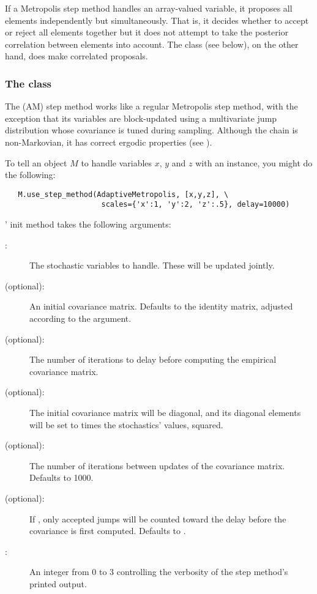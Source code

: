 If a Metropolis step method handles an array-valued variable, it proposes all elements independently but simultaneously. That is, it decides whether to accept or reject all elements together but it does not attempt to take the posterior correlation between elements into account. The  class (see below), on the other hand, does make correlated proposals.

\subsubsection[The AdaptiveMetropolis class]{The
 class}
\label{subsec:AM}
The  (AM) step method works like a regular Metropolis
step method, with the exception that its variables are block-updated using a
multivariate jump distribution whose covariance is tuned during sampling.
Although the chain is non-Markovian, it has correct ergodic properties (see
\cite{Haario:2001lr}).

To tell an  object $M$ to handle variables $x$, $y$ and $z$ with an
 instance, you might do the following:
\begin{verbatim}
   M.use_step_method(AdaptiveMetropolis, [x,y,z], \
                      scales={'x':1, 'y':2, 'z':.5}, delay=10000)
\end{verbatim}

' init method takes the following arguments:
\begin{description}
   \item[:] The stochastic variables to handle. These will be
updated jointly.
   \item[ (optional):] An initial covariance matrix. Defaults to the
identity matrix, adjusted according to the \code{scales} argument.
   \item[\code{delay} (optional):] The number of iterations to delay before
computing the empirical covariance matrix.
   \item[ (optional):] The initial covariance matrix will be
diagonal, and its diagonal elements will be set to \code{scales} times the
stochastics' values, squared.
   \item[ (optional):] The number of iterations between updates
of the covariance matrix. Defaults to 1000.
   \item[ (optional):] If , only accepted jumps will be
counted toward the delay before the covariance is first computed. Defaults to
\code{True}.
   \item[:] An integer from 0 to 3 controlling the verbosity of
the step method's printed output.
\end{description}

